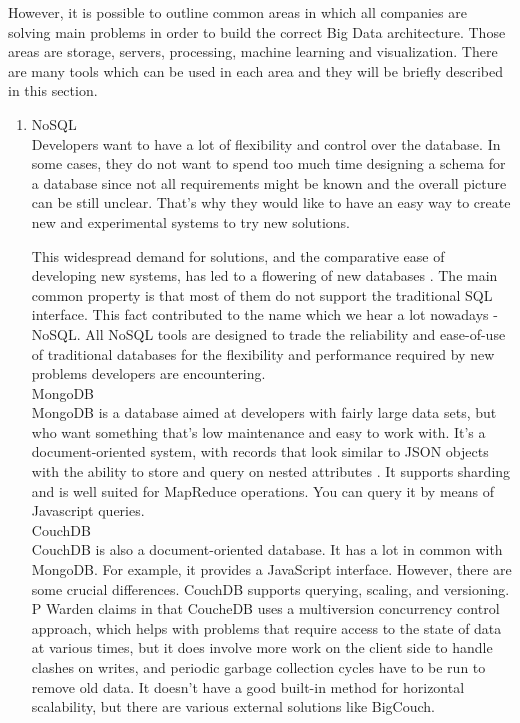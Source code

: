 \documentclass[runningheads]{llncs}
\begin{document}
However, it is possible to outline common areas in which all companies are solving main problems in order to build the correct Big Data architecture. Those areas are storage, servers, processing, machine learning and visualization. There are many tools which can be used in each area and they will be briefly described in this section. 

\begin{enumerate}
\item NoSQL\\

Developers want to have a lot of flexibility and control over the database. In some cases, they do not want to spend too much time designing a schema for a database since not all requirements might be known and the overall picture can be still unclear. That's why they would like to have an easy way to create new and experimental systems to try new solutions.

This widespread demand for solutions, and the comparative ease of developing new systems, has led to a flowering of new databases \cite{GLOSSARY}. The main common property is that most of them do not support the traditional SQL interface. This fact contributed to the name which we hear a lot nowadays - NoSQL. All NoSQL tools are designed to trade the reliability and ease-of-use of traditional databases for the flexibility and performance required by new problems developers are encountering.\\

MongoDB\\

MongoDB is a database aimed at developers with fairly large data sets, but who want something that’s low maintenance and easy to work with. It’s a document-oriented system, with records that look similar to JSON objects with the ability to store and query on nested attributes \cite{GLOSSARY}. It supports sharding and is well suited for MapReduce operations. You can query it by means of Javascript queries.\\ 

CouchDB\\

CouchDB is also a document-oriented database. It has a lot in common with MongoDB. For example, it provides
a JavaScript interface. However, there are some crucial differences. CouchDB supports querying, scaling, and versioning. P Warden claims in \cite{GLOSSARY} that CoucheDB uses a multiversion concurrency control approach, which helps with problems that require access to the state of data at various times, but it does involve more work on the client side to handle clashes on writes, and periodic garbage collection cycles have to be run to remove old data. It doesn’t have a good built-in method for horizontal scalability, but there are various external solutions like BigCouch.\\


\end{enumerate}
\end{document}
